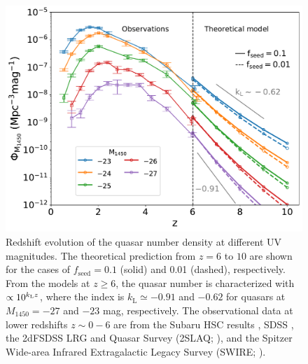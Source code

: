 \documentclass[twocolumn, twocolappendix]{aastex63}
\newcommand{\fseed}{f_\mathrm{seed}}
\newcommand{\Muv}{M_{1450}}
\begin{document}
\begin{CJK*}{UTF8}{gbsn}
\begin{figure}
\centering
\includegraphics[width=130mm]{QLFmag_z.pdf}
\caption{
Redshift evolution of the quasar number density at different UV magnitudes.
The theoretical prediction from $z=6$ to $10$ are shown for the cases of $\fseed=0.1$ (solid) and 0.01 (dashed), respectively.
From the models at $z\geq 6$, the quasar number is characterized with $\propto 10^{k_{\rm L}z}$,
where the index is $k_\mathrm{L} \simeq -0.91$ 
and $-0.62$ for quasars at $\Muv=-27$ and $-23$ mag, respectively.
The observational data at lower redshifts $z\sim 0-6$ are from the Subaru HSC results \citep{2018PASJ...70S..34A,2018ApJ...869..150M,2020ApJ...904...89N},
SDSS \citep{2006AJ....131.2766R,2013ApJ...768..105M},
the 2dFSDSS LRG and Quasar Survey (2SLAQ; \citealt{2009MNRAS.399.1755C}),
and the Spitzer Wide-area Infrared Extragalactic Legacy Survey (SWIRE; \citealt{2008ApJ...675...49S}).
}
\label{fig:QLFmag_z}
\vspace{5mm}
\end{figure}



\end{CJK*}
\end{document}
